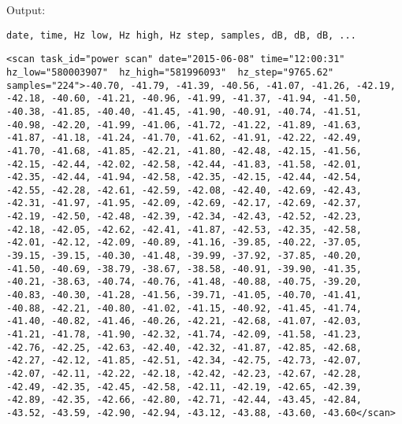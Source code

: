 Output:
\begin{lstlisting}date, time, Hz low, Hz high, Hz step, samples, dB, dB, dB, ...\end{lstlisting}

\begin{lstlisting}
<scan task_id="power scan" date="2015-06-08" time="12:00:31" hz_low="580003907"  hz_high="581996093"  hz_step="9765.62" samples="224">-40.70, -41.79, -41.39, -40.56, -41.07, -41.26, -42.19, -42.18, -40.60, -41.21, -40.96, -41.99, -41.37, -41.94, -41.50, -40.38, -41.85, -40.40, -41.45, -41.90, -40.91, -40.74, -41.51, -40.98, -42.20, -41.99, -41.06, -41.72, -41.22, -41.89, -41.63, -41.87, -41.18, -41.24, -41.70, -41.62, -41.91, -42.22, -42.49, -41.70, -41.68, -41.85, -42.21, -41.80, -42.48, -42.15, -41.56, -42.15, -42.44, -42.02, -42.58, -42.44, -41.83, -41.58, -42.01, -42.35, -42.44, -41.94, -42.58, -42.35, -42.15, -42.44, -42.54, -42.55, -42.28, -42.61, -42.59, -42.08, -42.40, -42.69, -42.43, -42.31, -41.97, -41.95, -42.09, -42.69, -42.17, -42.69, -42.37, -42.19, -42.50, -42.48, -42.39, -42.34, -42.43, -42.52, -42.23, -42.18, -42.05, -42.62, -42.41, -41.87, -42.53, -42.35, -42.58, -42.01, -42.12, -42.09, -40.89, -41.16, -39.85, -40.22, -37.05, -39.15, -39.15, -40.30, -41.48, -39.99, -37.92, -37.85, -40.20, -41.50, -40.69, -38.79, -38.67, -38.58, -40.91, -39.90, -41.35, -40.21, -38.63, -40.74, -40.76, -41.48, -40.88, -40.75, -39.20, -40.83, -40.30, -41.28, -41.56, -39.71, -41.05, -40.70, -41.41, -40.88, -42.21, -40.80, -41.02, -41.15, -40.92, -41.45, -41.74, -41.40, -40.82, -41.46, -40.26, -42.21, -42.68, -41.07, -42.03, -41.21, -41.78, -41.90, -42.32, -41.74, -42.09, -41.58, -41.23, -42.76, -42.25, -42.63, -42.40, -42.32, -41.87, -42.85, -42.68, -42.27, -42.12, -41.85, -42.51, -42.34, -42.75, -42.73, -42.07, -42.07, -42.11, -42.22, -42.18, -42.42, -42.23, -42.67, -42.28, -42.49, -42.35, -42.45, -42.58, -42.11, -42.19, -42.65, -42.39, -42.89, -42.35, -42.66, -42.80, -42.71, -42.44, -43.45, -42.84, -43.52, -43.59, -42.90, -42.94, -43.12, -43.88, -43.60, -43.60</scan>

\end{lstlisting}
